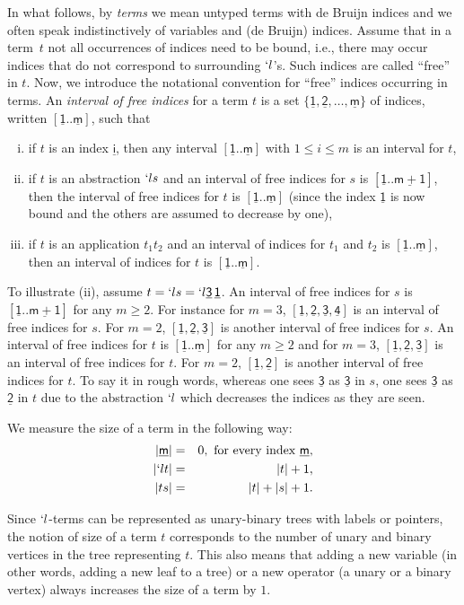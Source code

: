 \documentclass{jfp1}
\newcommand{\Var}[1]{\underline{\mathsf{#1}}}
\begin{document}
In what follows, by \emph{terms} we mean untyped terms with de Bruijn indices and we
often speak indistinctively of variables and (de Bruijn) indices.  Assume that in a
term~$t$ not all occurrences of indices need to be bound, i.e., there may occur indices that do
not correspond to surrounding $`l$'s. Such indices are called ``free'' in $t$.  Now,
we introduce the notational convention for ``free'' indices occurring in terms. An
\emph{interval of free indices} for a term $t$ is a set $\{\Var{1}, \Var{2}, \ldots,
\Var{m}\}$ of indices, written $[\Var{1}..\Var{m}]$, such that
\begin{enumerate}[(i)]
\item if $t$ is an index $\Var{i}$, then any interval $[\Var{1}..\Var{m}]$ with $1\le i\le m$ is an interval for $t$,
\item if $t$ is an abstraction $`l s$ and an interval of free indices for $s$ is
  $[\Var{1} .. \Var{m+1}]$, then the interval of free indices for $t$ is
  $[\Var{1} .. \Var{m}]$ (since the index $\Var{1}$ is now bound and the others are
  assumed to decrease by one),
\item if $t$ is an application $t_1 t_2$ and an interval of indices for $t_1$ and
  $t_2$ is $[\Var{1} .. \Var{m}]$, then an interval of indices for $t$ is
  $[\Var{1} .. \Var{m}]$.
\end{enumerate}
To illustrate (ii), assume $t = `l s = `l \Var{3}\,\Var{1}$. An interval of free
indices for $s$ is $[\Var{1} .. \Var{m+1}]$ for any $m\ge 2$.  For
instance for $m=3$, $[ \Var{1},\Var{2}, \Var{3}, \Var{4} ]$ is an interval of free
indices for $s$.  For ${m=2}$, $[ \Var{1},\Var{2}, \Var{3} ]$ is another interval of
free indices for $s$. An interval of free indices for $t$ is $[\Var{1} .. \Var{m}]$ 
for any $m\ge 2$ and for $m=3$, $[ \Var{1},\Var{2}, \Var{3}]$ is an
interval of free indices for $t$.  For $m=2$, $[\Var{1},\Var{2}]$ is another interval
of free indices for $t$.  To say it in rough words, whereas one sees $\Var{3}$ as
$\Var{3}$ in $s$, one sees $\Var{3}$ as $\Var{2}$ in $t$ due to the abstraction $`l$
which decreases the indices as they are seen.

We measure the size of a term in the following way:
\begin{eqnarray*}
|\Var{m}| &=& 0, \textrm{~for every index~} \Var{m},\\
|`l t| &=& |t| + 1,\\
|t s| &=& |t| + |s| + 1.
\end{eqnarray*}

Since $`l$-terms can be represented as unary-binary trees with labels or pointers,
the notion of size of a term $t$ corresponds to the number of unary and binary
vertices in the tree representing $t$. This also means that adding a new variable (in
other words, adding a new leaf to a tree) or a new operator (a unary or a binary
vertex) always increases the size of a term by $1$.
\end{document}
